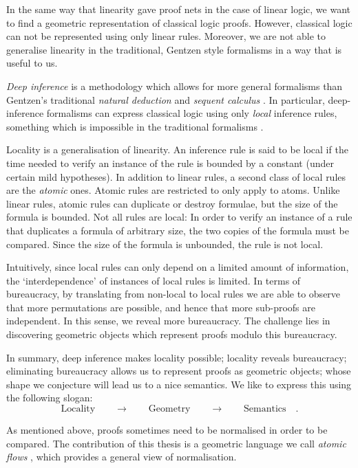 In the same way that linearity gave proof nets in the case of linear logic, we want to find a geometric representation of classical logic proofs. However, classical logic can not be represented using only linear rules. Moreover, we are not able to generalise linearity in the traditional, Gentzen style formalisms in a way that is useful to us.

\emph{Deep inference} \cite{Gugl:06:A-System:kl} is a methodology which allows for more general formalisms than Gentzen's traditional \emph{natural deduction} and \emph{sequent calculus} \cite{Gent:69:Investig:xi}. In particular, deep-inference formalisms can express classical logic using only \emph{local} \cite{BrunTiu:01:A-Local-:mz} inference rules, something which is impossible in the traditional formalisms \cite{Brun:03:Two-Rest:mn}.

Locality is a generalisation of linearity. An inference rule is said to be local if the time needed to verify an instance of the rule is bounded by a constant (under certain mild hypotheses). In addition to linear rules, a second class of local rules are the \emph{atomic} ones. Atomic rules are restricted to only apply to atoms. Unlike linear rules, atomic rules can duplicate or destroy formulae, but the size of the formula is bounded. Not all rules are local: In order to verify an instance of a rule that duplicates a formula of arbitrary size, the two copies of the formula must be compared. Since the size of the formula is unbounded, the rule is not local.

Intuitively, since local rules can only depend on a limited amount of information, the `interdependence' of instances of local rules is limited. In terms of bureaucracy, by translating from non-local to local rules we are able to observe that more permutations are possible, and hence that more sub-proofs are independent. In this sense, we reveal more bureaucracy. The challenge lies in discovering geometric objects which represent proofs modulo this bureaucracy.

In summary, deep inference makes locality possible; locality reveals bureaucracy; eliminating bureaucracy allows us to represent proofs as geometric objects; whose shape we conjecture will lead us to a nice semantics. We like to express this using the following slogan:
\[
\mbox{Locality}\qquad\rightarrow\qquad\mbox{Geometry}\qquad\rightarrow\qquad\mbox{Semantics}\quad.
\]

As mentioned above, proofs sometimes need to be normalised in order to be compared. The contribution of this thesis is a geometric language we call \emph{atomic flows} \cite{GuglGund:07:Normalis:lr}, which provides a general view of normalisation.

